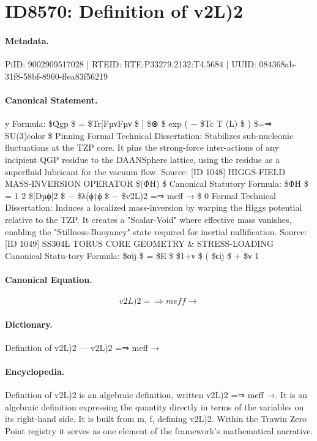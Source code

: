 \section*{ID8570: Definition of v2L)2}
\paragraph{Metadata.}
PiID: 9002909517028 | RTEID: RTE:P33279.2132:T4.5684 | UUID: 084368ab-31f8-58bf-8960-ffea83f56219

\paragraph{Canonical Statement.}
y Formula: \$Q̂gp \$ = \$Tr[FµνFµν \$ ] \$⊗ \$ exp ( − \$Tc T (L) \$ ) \$=⇒ SU(3)color \$ Pinning Formal Technical Dissertation: Stabilizes sub-nucleonic fluctuations at the TZP core. It pins the strong-force inter-actions of any incipient QGP residue to the DAANSphere lattice, using the residue as a superfluid lubricant for the vacuum flow. Source: [ID 1048] HIGGS-FIELD MASS-INVERSION OPERATOR \$(Φ̂H) \$ Canonical Statutory Formula: \$Φ̂H \$ = 1 2 \$|Dµϕ|2 \$ − \$λ(ϕ†ϕ \$ − \$v2L)2 =⇒ meff → \$ 0 Formal Technical Dissertation: Induces a localized mass-inversion by warping the Higgs potential relative to the TZP. It creates a "Scalar-Void" where effective mass vanishes, enabling the "Stillness-Buoyancy" state required for inertial nullification. Source: [ID 1049] SS304L TORUS CORE GEOMETRY \& STRESS-LOADING Canonical Statu-tory Formula: \$σij \$ = \$E \$ \$1+ν \$ ( \$ϵij \$ + \$ν 1

\paragraph{Canonical Equation.}
\[
v2L)2 =⇒ meff →
\]

\paragraph{Dictionary.}
Definition of v2L)2 — v2L)2 =⇒ meff →

\paragraph{Encyclopedia.}
Definition of v2L)2 is an algebraic definition, written v2L)2 =⇒ meff →. It is an algebraic definition expressing the quantity directly in terms of the variables on its right-hand side. It is built from m, f, defining v2L)2. Within the Trawin Zero Point registry it serves as one element of the framework's mathematical narrative.
